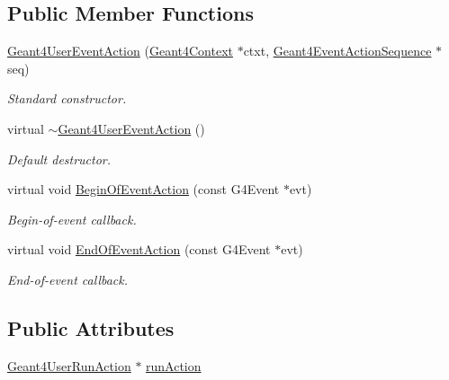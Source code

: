 \subsection*{Public Member Functions}
\begin{DoxyCompactItemize}
\item 
\hyperlink{class_d_d4hep_1_1_simulation_1_1_geant4_user_event_action_a5d519de614318d3277d06587b93bde92}{Geant4UserEventAction} (\hyperlink{class_d_d4hep_1_1_simulation_1_1_geant4_context}{Geant4Context} $\ast$ctxt, \hyperlink{class_d_d4hep_1_1_simulation_1_1_geant4_event_action_sequence}{Geant4EventActionSequence} $\ast$seq)
\begin{DoxyCompactList}\small\item\em Standard constructor. \item\end{DoxyCompactList}\item 
virtual \hyperlink{class_d_d4hep_1_1_simulation_1_1_geant4_user_event_action_ac79b641d26fd4e4cbecc99460baf4d4f}{$\sim$Geant4UserEventAction} ()
\begin{DoxyCompactList}\small\item\em Default destructor. \item\end{DoxyCompactList}\item 
virtual void \hyperlink{class_d_d4hep_1_1_simulation_1_1_geant4_user_event_action_ab88c990f7010805421170eeb8f86ff86}{BeginOfEventAction} (const G4Event $\ast$evt)
\begin{DoxyCompactList}\small\item\em Begin-\/of-\/event callback. \item\end{DoxyCompactList}\item 
virtual void \hyperlink{class_d_d4hep_1_1_simulation_1_1_geant4_user_event_action_a5fe13da05fc37d5d69ed814b061cada0}{EndOfEventAction} (const G4Event $\ast$evt)
\begin{DoxyCompactList}\small\item\em End-\/of-\/event callback. \item\end{DoxyCompactList}\end{DoxyCompactItemize}
\subsection*{Public Attributes}
\begin{DoxyCompactItemize}
\item 
\hyperlink{class_d_d4hep_1_1_simulation_1_1_geant4_user_run_action}{Geant4UserRunAction} $\ast$ \hyperlink{class_d_d4hep_1_1_simulation_1_1_geant4_user_event_action_ac97fb9f30ba15e30d50897aabc0ad004}{runAction}
\end{DoxyCompactItemize}


